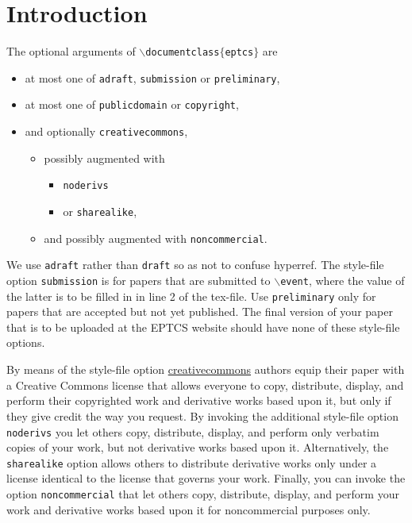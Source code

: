 \documentclass[submission,copyright,creativecommons]{eptcs}
\begin{document}


\section{Introduction}

The optional arguments of {\tt $\backslash$documentclass$\{$eptcs$\}$} are
\begin{itemize}
\item at most one of
{\tt adraft},
{\tt submission} or
{\tt preliminary},
\item at most one of {\tt publicdomain} or {\tt copyright},
\item and optionally {\tt creativecommons},
  \begin{itemize}
  \item possibly augmented with
    \begin{itemize}
    \item {\tt noderivs}
    \item or {\tt sharealike},
    \end{itemize}
  \item and possibly augmented with {\tt noncommercial}.
  \end{itemize}
\end{itemize}
We use {\tt adraft} rather than {\tt draft} so as not to confuse hyperref.
The style-file option {\tt submission} is for papers that are
submitted to {\tt $\backslash$event}, where the value of the latter is
to be filled in in line 2 of the tex-file. Use {\tt preliminary} only
for papers that are accepted but not yet published. The final version
of your paper that is to be uploaded at the EPTCS website should have
none of these style-file options.

By means of the style-file option
\href{http://creativecommons.org/about/license/}{creativecommons}
authors equip their paper with a Creative Commons license that allows
everyone to copy, distribute, display, and perform their copyrighted
work and derivative works based upon it, but only if they give credit
the way you request. By invoking the additional style-file option {\tt
noderivs} you let others copy, distribute, display, and perform only
verbatim copies of your work, but not derivative works based upon
it. Alternatively, the {\tt sharealike} option allows others to
distribute derivative works only under a license identical to the
license that governs your work. Finally, you can invoke the option
{\tt noncommercial} that let others copy, distribute, display, and
perform your work and derivative works based upon it for
noncommercial purposes only.
\end{document}
